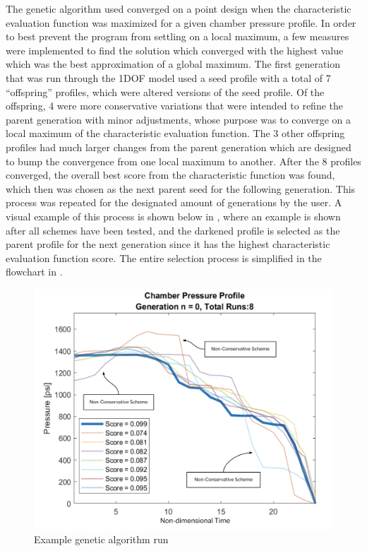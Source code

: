 The genetic algorithm used converged on a point design when the characteristic evaluation function was maximized for a given chamber pressure profile. In order to best prevent the program from settling on a local maximum, a few measures were implemented to find the solution which converged with the highest value which was the best approximation of a global maximum. The first generation that was run through the 1DOF model used a seed profile with a total of 7 ``offspring'' profiles, which were altered versions of the seed profile. Of the offspring, 4 were more conservative variations that were intended to refine the parent generation with minor adjustments, whose purpose was to converge on a local maximum of the characteristic evaluation function. The 3 other offspring profiles had much larger changes from the parent generation which are designed to bump the convergence from one local maximum to another. After the 8 profiles converged, the overall best score from the characteristic function was found, which then was chosen as the next parent seed for the following generation. This process was repeated for the designated amount of generations by the user. A visual example of this process is shown below in , where an example is shown after all schemes have been tested, and the darkened profile is selected as the parent profile for the next generation since it has the highest characteristic evaluation function score. The entire selection process is simplified in the flowchart in .

\begin{figure}
    \centering
    \includegraphics[width=0.7\linewidth]{images/genetic-chamber-pressure}
    \caption{Example genetic algorithm run}
    \label{figure:genetic-chamber-pressure}
\end{figure}


